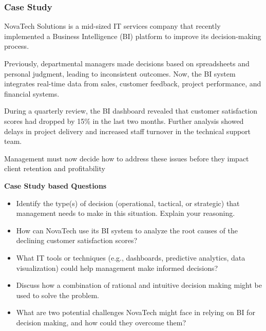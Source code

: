 \subsubsection{Case Study}

\indent 

NovaTech Solutions is a mid-sized IT services company that recently implemented a Business Intelligence (BI) platform to improve its decision-making process.

Previously, departmental managers made decisions based on spreadsheets and personal judgment, leading to inconsistent outcomes. Now, the BI system integrates real-time data from sales, customer feedback, project performance, and financial systems.

During a quarterly review, the BI dashboard revealed that customer satisfaction scores had dropped by 15\% in the last two months. Further analysis showed delays in project delivery and increased staff turnover in the technical support team.

Management must now decide how to address these issues before they impact client retention and profitability

\bigskip

\noindent \textbf{Case Study based Questions}

\begin{itemize}
    \item Identify the type(s) of decision (operational, tactical, or strategic) that management needs to make in this situation. Explain your reasoning.
    \item How can NovaTech use its BI system to analyze the root causes of the declining customer satisfaction scores?
    \item What IT tools or techniques (e.g., dashboards, predictive analytics, data visualization) could help management make informed decisions?
    \item Discuss how a combination of rational and intuitive decision making might be used to solve the problem.
    \item What are two potential challenges NovaTech might face in relying on BI for decision making, and how could they overcome them?
\end{itemize}